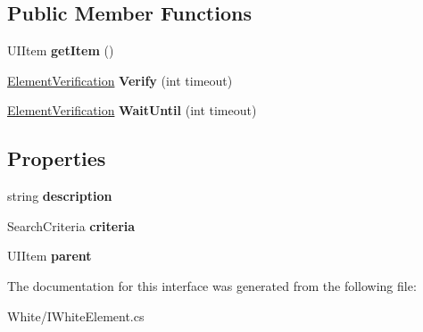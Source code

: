\subsection*{Public Member Functions}
\begin{DoxyCompactItemize}
\item 
\hypertarget{interface_proto_test_1_1_golem_1_1_white_1_1_elements_1_1_i_white_element_a877f33f1d85bb749a45ea72a85a2a49b}{U\-I\-Item {\bfseries get\-Item} ()}\label{interface_proto_test_1_1_golem_1_1_white_1_1_elements_1_1_i_white_element_a877f33f1d85bb749a45ea72a85a2a49b}

\item 
\hypertarget{interface_proto_test_1_1_golem_1_1_white_1_1_elements_1_1_i_white_element_a0a00b2bad6119def2844b22ebecabebb}{\hyperlink{class_proto_test_1_1_golem_1_1_white_1_1_element_verification}{Element\-Verification} {\bfseries Verify} (int timeout)}\label{interface_proto_test_1_1_golem_1_1_white_1_1_elements_1_1_i_white_element_a0a00b2bad6119def2844b22ebecabebb}

\item 
\hypertarget{interface_proto_test_1_1_golem_1_1_white_1_1_elements_1_1_i_white_element_ad100c95d72d02c8bbc8eeef4931f8238}{\hyperlink{class_proto_test_1_1_golem_1_1_white_1_1_element_verification}{Element\-Verification} {\bfseries Wait\-Until} (int timeout)}\label{interface_proto_test_1_1_golem_1_1_white_1_1_elements_1_1_i_white_element_ad100c95d72d02c8bbc8eeef4931f8238}

\end{DoxyCompactItemize}
\subsection*{Properties}
\begin{DoxyCompactItemize}
\item 
\hypertarget{interface_proto_test_1_1_golem_1_1_white_1_1_elements_1_1_i_white_element_ad2d976ad8aad8b54aa844295205a05f5}{string {\bfseries description}}\label{interface_proto_test_1_1_golem_1_1_white_1_1_elements_1_1_i_white_element_ad2d976ad8aad8b54aa844295205a05f5}

\item 
\hypertarget{interface_proto_test_1_1_golem_1_1_white_1_1_elements_1_1_i_white_element_a682ce2aa52033111ebbc6c71aad3fad2}{Search\-Criteria {\bfseries criteria}}\label{interface_proto_test_1_1_golem_1_1_white_1_1_elements_1_1_i_white_element_a682ce2aa52033111ebbc6c71aad3fad2}

\item 
\hypertarget{interface_proto_test_1_1_golem_1_1_white_1_1_elements_1_1_i_white_element_aff8bf6be3e63d4d419fe183e67079bcf}{U\-I\-Item {\bfseries parent}}\label{interface_proto_test_1_1_golem_1_1_white_1_1_elements_1_1_i_white_element_aff8bf6be3e63d4d419fe183e67079bcf}

\end{DoxyCompactItemize}


The documentation for this interface was generated from the following file\-:\begin{DoxyCompactItemize}
\item 
White/I\-White\-Element.\-cs\end{DoxyCompactItemize}
